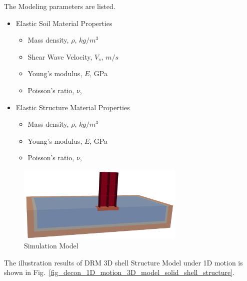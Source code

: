 The Modeling parameters are listed.
\begin{itemize}
  \item Elastic Soil Material Properties 
  \begin{itemize}
    \item Mass density, $\rho$, \enspace {} $kg/m^3$
    \item Shear Wave Velocity, $V_s$, \enspace {} $m/s$
    \item Young's modulus, $E$, \enspace {} GPa
    \item Poisson's ratio, $\nu$, \enspace {}
  \end{itemize}
  \item Elastic Structure Material Properties 
  \begin{itemize}
    \item Mass density, $\rho$, \enspace {} $kg/m^3$
    \item Young's modulus, $E$, \enspace {} GPa
    \item Poisson's ratio, $\nu$, \enspace {}
  \end{itemize}
\end{itemize}

\begin{figure}[H]
  \centering
  \includegraphics[width = 8cm]{./Figure-files/Day2/Deconvolution_1D_Motions/Shell_Structure_Soil_Interaction_3D_DRM/overview.png}
  \caption{Simulation Model}
  \label{fig_decon_1D_motion_3D_model_shell1}
\end{figure}


The illustration results of DRM 3D shell Structure Model under 1D motion is shown 
in Fig.~\ref{fig_decon_1D_motion_3D_model_solid_shell_structure}. 

